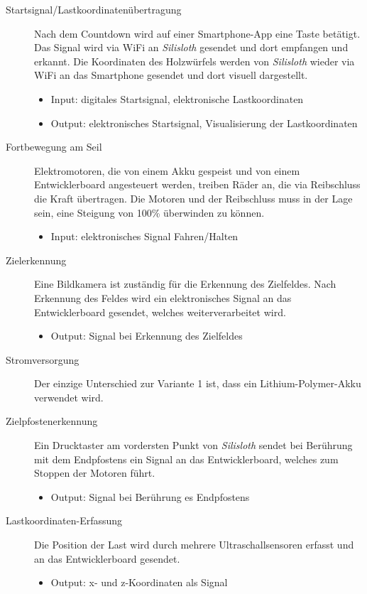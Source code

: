 \documentclass[a4paper,11pt]{scrartcl}
\begin{document}
\begin{description}
    \item [Startsignal/Lastkoordinatenübertragung] Nach dem Count\-down wird auf einer Smart\-phone-App eine Taste betätigt. Das Signal wird via WiFi an \textit{Silisloth} gesendet und dort empfangen und erkannt. Die Koordinaten des Holzwürfels werden von \textit{Silisloth} wieder via WiFi an das Smartphone gesendet und dort visuell dargestellt.
    \begin{itemize}
        \item Input: digitales Startsignal, elektronische Lastkoordinaten
        \item Output: elektronisches Startsignal, Visualisierung der Lastkoordinaten
    \end{itemize}
    \item [Fortbewegung am Seil] Elektromotoren, die von einem Akku gespeist und von einem Entwicklerboard angesteuert werden, treiben Räder an, die via Reibschluss die Kraft übertragen. Die Motoren und der Reibschluss muss in der Lage sein, eine Steigung von 100\% überwinden zu können.
    \begin{itemize}
        \item Input: elektronisches Signal Fahren/Halten
    \end{itemize}
    \item [Zielerkennung] Eine Bildkamera ist zuständig für die Erkennung des Zielfeldes. Nach Erkennung des Feldes wird ein elektronisches Signal an das Entwicklerboard gesendet, welches weiterverarbeitet wird.
    \begin{itemize}
        \item Output: Signal bei Erkennung des Zielfeldes
    \end{itemize}
    \item [Stromversorgung] Der einzige Unterschied zur Variante 1 ist, dass ein Lithium-Polymer-Akku verwendet wird.
    \item [Zielpfostenerkennung] Ein Drucktaster am vordersten Punkt von \textit{Silisloth} sendet bei Berührung mit dem Endpfostens ein Signal an das Entwicklerboard, welches zum Stoppen der Motoren führt.
    \begin{itemize}
        \item Output: Signal bei Berührung es Endpfostens
    \end{itemize}
    \item [Lastkoordinaten-Erfassung] Die Position der Last wird durch mehrere Ultraschallsensoren erfasst und an das Entwicklerboard gesendet.
    \begin{itemize}
        \item Output: x- und z-Koordinaten als Signal
    \end{itemize}
\end{description}
\end{document}
